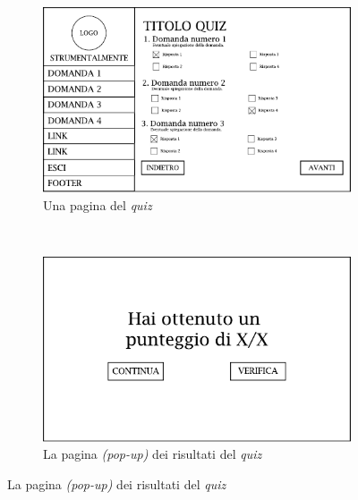 \begin{figure}[H]\ContinuedFloat
	\begin{subfigure}[t]{\textwidth}
		\centering
		\includegraphics[width=\textwidth]{gabbie_logiche/Pagina_Quiz}
		\caption{Una pagina del \emph{quiz}}
	\end{subfigure}
	~\vskip40pt
	\begin{subfigure}[t]{\textwidth}
		\centering
		\includegraphics[width=\textwidth]{gabbie_logiche/Risultati_Quiz}
		\caption{La pagina \emph{(pop-up)} dei risultati del \emph{quiz}}
	\end{subfigure}
\end{figure}

\vspace*{\fill}
\clearpage

